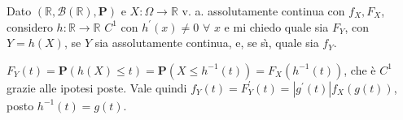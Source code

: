 \documentclass{article}
\begin{document}
Dato $\left( 
\mathbb{R}
,\mathcal{B}\left( 
\mathbb{R}
\right) ,\mathbf{P}\right) $ e $X:\Omega \rightarrow 
\mathbb{R}
$ v. a. assolutamente continua con $f_{X},F_{X}$, considero $h:%
\mathbb{R}
\rightarrow 
\mathbb{R}
$ $C^{1}$ con $h^{\prime }\left( x\right) \neq 0$ $\forall $ $x$ e mi chiedo
quale sia $F_{Y}$, con $Y=h\left( X\right) $, se $Y$ sia assolutamente
continua, e, se s\`{\i}, quale sia $f_{Y}$.

$F_{Y}\left( t\right) =\mathbf{P}\left( h\left( X\right) \leq t\right) =%
\mathbf{P}\left( X\leq h^{-1}\left( t\right) \right) =F_{X}\left(
h^{-1}\left( t\right) \right) $, che \`{e} $C^{1}$ grazie alle ipotesi
poste. Vale quindi $f_{Y}\left( t\right) =F_{Y}^{\prime }\left( t\right)
=\left\vert g^{\prime }\left( t\right) \right\vert f_{X}\left( g\left(
t\right) \right) $, posto $h^{-1}\left( t\right) =g\left( t\right) $.
\end{document}
